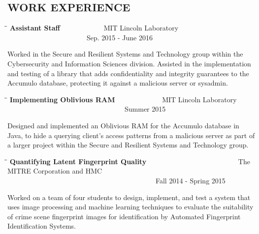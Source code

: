 \documentclass{res}
\begin{document}
\begin{resume}
\section{WORK EXPERIENCE}
\vspace{0in}
    \begin{tabbing}
   \hspace{3in}\=  \hspace{1.63in}\= \kill %
    {\bf Assistant Staff} \>~~~~~~~~~~~~MIT Lincoln Laboratory \>~~~~~~~~~~~~~~~~~~~~~~~Sep. 2015 - June 2016\\                       
   \end{tabbing}\vspace{-30pt}      %
    Worked in the Secure and Resilient Systems and Technology group within the Cybersecurity and Information Sciences division.  Assisted in the implementation and testing of a library that adds confidentiality and integrity guarantees to the Accumulo database, protecting it against a malicious server or sysadmin.

   \begin{tabbing}
   \hspace{3in}\=  \hspace{1.63in}\= \kill %
    {\bf Implementing Oblivious RAM} \>~~~~~~~~~~~~~MIT Lincoln Laboratory \>~~~~~~~~~~~~~~~~~~~~~~~~~~~~~~~~~~Summer 2015\\                       
   \end{tabbing}\vspace{-30pt}      %
    Designed and implemented an Oblivious RAM for the Accumulo database in Java, to hide a querying client's access patterns from a malicious server as part of a larger project within the Secure and Resilient Systems and Technology group.

   \begin{tabbing}
   \hspace{2in}\=  \hspace{1.63in}\= \kill %
    {\bf Quantifying Latent Fingerprint Quality} \>~~~~~~~~~~~~~~~~~~~~~~~~~~The MITRE Corporation
    and HMC  \>~~~~~~~~~~~~~~~~~~~~~~~~~~~~~~~~~~~~~~~~~~~Fall 2014 - Spring 2015\\                       
   \end{tabbing}\vspace{-30pt}      %
    Worked on a team of four students to design, implement, and test a system that uses image processing and machine learning techniques to evaluate the suitability of crime scene fingerprint images for identification by Automated Fingerprint Identification Systems.


\end{resume}
\end{document}
